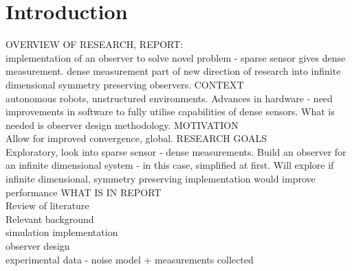 \chapter{Introduction}
OVERVIEW OF RESEARCH, REPORT:\\
	implementation of an observer to solve novel problem - sparse sensor gives dense measurement.
	dense measurement part of new direction of research into infinite dimensional symmetry preserving observers.
CONTEXT\\
	autonomous robots, unstructured environments. Advances in hardware - need improvements in software to fully utilise capabilities of dense sensors.
	What is needed is observer design methodology.
MOTIVATION\\
	Allow for improved convergence, global. 
RESEARCH GOALS\\
	Exploratory, look into sparse sensor - dense measurements. Build an observer for an infinite dimensional system - in this case, simplified at first. Will explore if infinite dimensional, symmetry preserving implementation would improve performance
WHAT IS IN REPORT\\
	Review of literature\\
	Relevant background\\
	simulation implementation\\
	observer design\\
	experimental data - noise model + measurements collected

